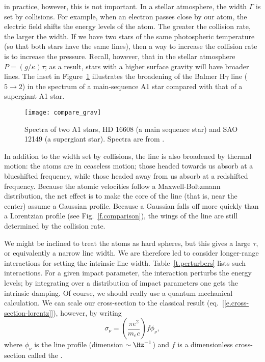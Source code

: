  in practice, however, this is not important.  In a stellar atmosphere, the width $\Gamma$ is set by collisions.  For example, when an electron passes close by our atom, the electric field shifts the energy levels of the atom.  The greater the collision rate, the larger the width.
If we have two stars of the same photospheric temperature (so that both stars have the same lines), then a way to increase the collision rate is to increase the pressure. Recall, however, that in the stellar atmosphere $P = (g/\kappa)\tau$; as a result, stars with a higher surface gravity will have broader lines. The inset in Figure~\ref{f.compare_grav} illustrates the broadening of the Balmer H$\gamma$ line ($5\to 2$) in the spectrum of a main-sequence A1 star compared with that of a supergiant A1 star.

\begin{figure}[hp]
    \texttt{[image: compare\_grav]}
    \caption[Spectra of two A1 stars]{\label{f.compare_grav}
    Spectra of two A1 stars, HD 16608 (a main sequence star) and SAO 12149 (a supergiant star).  Spectra are from \citet{Jacoby1984A-library-of-st}.
    }
\end{figure}

In addition to the width set by collisions, the line is also broadened by thermal motion: the atoms are in ceaseless motion; those headed towards us absorb at a blueshifted frequency, while those headed away from us absorb at a redshifted frequency.  Because the atomic velocities follow a Maxwell-Boltzmann distribution, the net effect is to make the core of the line (that is, near the center) assume a Gaussian profile.  Because a Gaussian falls off more quickly than a Lorentzian profile (see Fig.~\ref{f.comparison}), the wings of the line are still determined by the collision rate.

We might be inclined to treat the atoms as hard spheres, but this gives a large $\tau$, or equivalently a narrow line width. We are therefore led to consider longer-range interactions for setting the intrinsic line width. Table~\ref{t.perturbers} lists such interactions. For a given impact parameter, the interaction perturbs the energy levels; by integrating over a distribution of  impact parameters one gets the intrinsic damping. Of course, we should really use a quantum mechanical calculation.  We can scale our cross-section to the classical result (eq.~[\ref{e.cross-section-lorentz}]), however, by writing
\begin{equation}\label{e.cross-section}
	 \sigma_{\nu} = \left(\frac{\pi e^{2}}{m_{e}c}\right) f \phi_{\nu}, 
\end{equation}
where $\phi_{\nu}$ is the line profile (dimension $\sim \Hz^{-1}$) and $f$ is a dimensionless cross-section called the .

